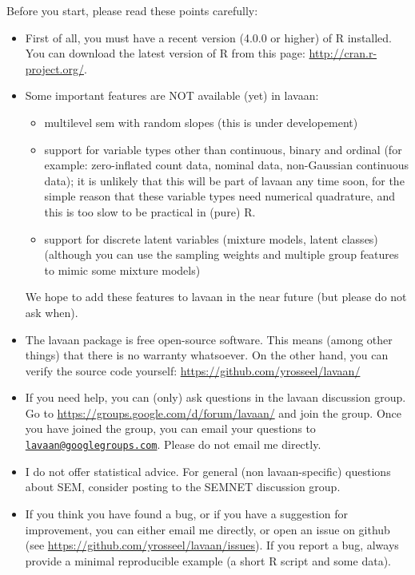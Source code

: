 Before you start, please read these points carefully:

\begin{itemize}
\item
  First of all, you must have a recent version (4.0.0 or higher) of R
  installed. You can download the latest version of R from this page:
  \url{http://cran.r-project.org/}.
\item
  Some important features are NOT available (yet) in lavaan:

  \begin{itemize}
  \item
    multilevel sem with random slopes (this is under developement)
  \item
    support for variable types other than continuous, binary and ordinal
    (for example: zero-inflated count data, nominal data, non-Gaussian
    continuous data); it is unlikely that this will be part of lavaan
    any time soon, for the simple reason that these variable types need
    numerical quadrature, and this is too slow to be practical in (pure)
    R.
  \item
    support for discrete latent variables (mixture models, latent
    classes) (although you can use the sampling weights and multiple
    group features to mimic some mixture models)
  \end{itemize}

  We hope to add these features to lavaan in the near future (but please
  do not ask when).
\item
  The lavaan package is free open-source software. This means (among
  other things) that there is no warranty whatsoever. On the other hand,
  you can verify the source code yourself:
  \url{https://github.com/yrosseel/lavaan/}
\item
  If you need help, you can (only) ask questions in the lavaan
  discussion group. Go to
  \url{https://groups.google.com/d/forum/lavaan/} and join the group.
  Once you have joined the group, you can email your questions to
  \href{mailto:lavaan@googlegroups.com}{\nolinkurl{lavaan@googlegroups.com}}.
  Please do not email me directly.
\item
  I do not offer statistical advice. For general (non lavaan-specific)
  questions about SEM, consider posting to the SEMNET discussion group.
\item
  If you think you have found a bug, or if you have a suggestion for
  improvement, you can either email me directly, or open an issue on
  github (see \url{https://github.com/yrosseel/lavaan/issues}). If you
  report a bug, always provide a minimal reproducible example (a short R
  script and some data).
\end{itemize}
